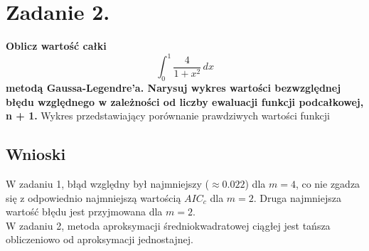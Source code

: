\documentclass{article}
\begin{document}
\section*{Zadanie 2.}
\textbf{Oblicz wartość całki $$ \int_{0}^{1} \frac{4}{1+x^2} \,dx $$
metodą Gaussa-Legendre’a. Narysuj wykres wartości bezwzględnej
błędu względnego w zależności od liczby ewaluacji funkcji
podcałkowej, n + 1.}
\newpage
Wykres przedstawiający porównanie prawdziwych wartości funkcji 


\subsection*{Wnioski}
\null\quad W zadaniu 1, błąd względny był najmniejszy ($\approx0.022$) dla $m=4$, co nie
zgadza się z odpowiednio najmniejszą wartością $AIC_c$ dla $m=2$. Druga najmniejsza wartość
błędu jest przyjmowana dla $m=2$. \\
\null\quad W zadaniu 2, metoda aproksymacji średniokwadratowej ciągłej
jest tańsza obliczeniowo od aproksymacji jednostajnej.
\end{document}
